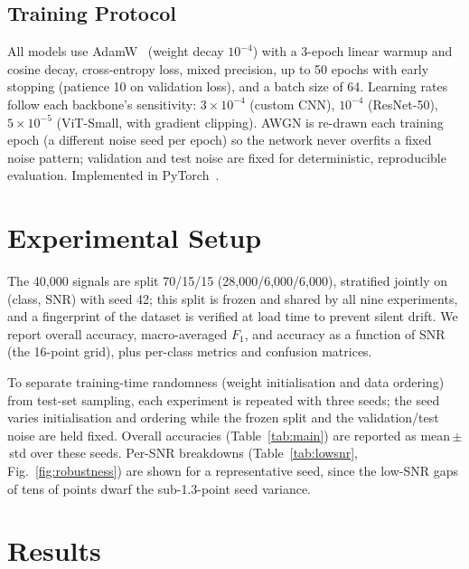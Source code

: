 \documentclass[journal]{IEEEtran}
\begin{document}
\subsection{Training Protocol}
\label{sec:training}
All models use AdamW~\cite{loshchilov2019adamw} (weight decay $10^{-4}$) with a
3-epoch linear warmup and cosine decay, cross-entropy loss, mixed precision, up
to 50 epochs with early stopping (patience 10 on validation loss), and a batch
size of 64. Learning rates follow each backbone's sensitivity: $3\times10^{-4}$
(custom CNN), $10^{-4}$ (ResNet-50), $5\times10^{-5}$ (ViT-Small, with gradient
clipping). AWGN is re-drawn each training epoch (a different noise seed per
epoch) so the network never overfits a fixed noise pattern; validation and test
noise are fixed for deterministic, reproducible evaluation. Implemented in
PyTorch~\cite{paszke2019pytorch}.

\section{Experimental Setup}
The 40{,}000 signals are split 70/15/15 (28{,}000/6{,}000/6{,}000), stratified
jointly on (class, SNR) with seed 42; this split is frozen and shared by all nine
experiments, and a fingerprint of the dataset is verified at load time to prevent
silent drift. We report overall accuracy, macro-averaged $F_1$, and accuracy as a
function of SNR (the 16-point grid), plus per-class metrics and confusion
matrices.

To separate training-time randomness (weight initialisation and data ordering)
from test-set sampling, each experiment is repeated with three seeds; the seed
varies initialisation and ordering while the frozen split and the
validation/test noise are held fixed. Overall accuracies (Table~\ref{tab:main})
are reported as mean\,$\pm$\,std over these seeds. Per-SNR breakdowns
(Table~\ref{tab:lowsnr}, Fig.~\ref{fig:robustness}) are shown for a representative
seed, since the low-SNR gaps of tens of points dwarf the sub-1.3-point seed
variance.

\section{Results}
\end{document}
